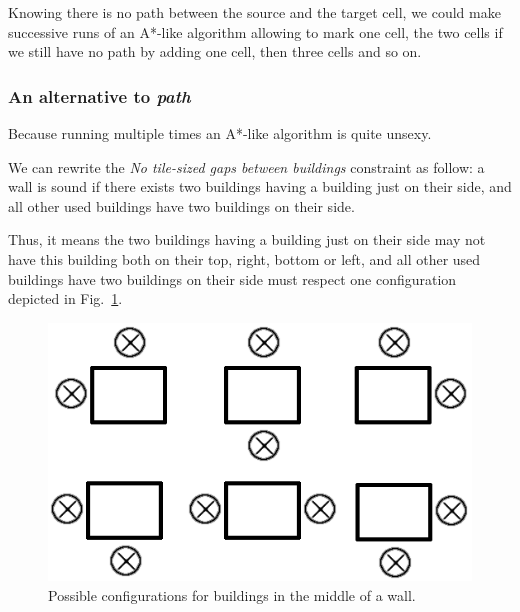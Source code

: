 \documentclass[a4paper,11pt]{article}
\begin{document}
Knowing there  is no path between  the source and the  target cell, we
could make  successive runs of  an A*-like algorithm allowing  to mark
one cell, the two  cells if we still have no path  by adding one cell,
then three cells and so on.

\subsubsection{An alternative to {\em path}}

Because running multiple times an A*-like algorithm is quite unsexy.

We  can  rewrite  the  {\em  No  tile-sized  gaps  between  buildings}
constraint as  follow: a wall is  sound if there  exists two buildings
having a  building just  on their side,  and all other  used buildings
have two buildings on their side.

Thus, it means the two buildings  having a building just on their side
may not have  this building both on their top,  right, bottom or left,
and all  other used  buildings have two  buildings on their  side must
respect         one          configuration         depicted         in
Fig.~\ref{figs:buildings_middle}. 

\begin{figure}[!h]
  \centering
  \includegraphics[width=.6\linewidth]{figs/buildings_middle}
  \caption{Possible configurations for buildings in the middle of a wall.}
  \label{figs:buildings_middle}
\end{figure}
\end{document}
